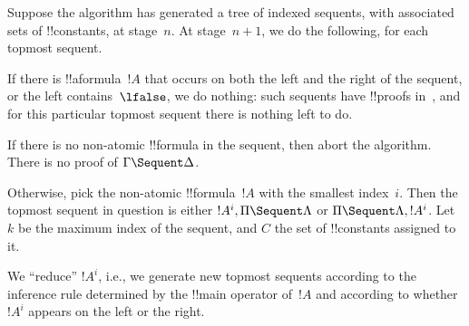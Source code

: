 \documentclass[../../../include/open-logic-section]{subfiles}
\begin{document}
Suppose the algorithm has generated a tree of indexed sequents, with
associated sets of !!{constant}s, at stage~$n$. At stage~$n+1$, we do
the following, for each topmost sequent. 

If there is !!a{formula}~$!A$ that occurs on both the left and the
right of the sequent, or the left contains~$\lfalse$, we do nothing:
such sequents have !!{proof}s in~, and for this particular
topmost sequent there is nothing left to do.

If there is no non-atomic !!{formula} in the sequent, then abort the
algorithm. There is no proof of $\Gamma \Sequent \Delta$.

Otherwise, pick the non-atomic !!{formula}~$!A$ with the smallest
index~$i$. Then the topmost sequent in question is either $!A^i, \Pi
\Sequent \Lambda$ or $\Pi \Sequent \Lambda, !A^i$. Let $k$ be the
maximum index of the sequent, and $C$ the set of !!{constant}s
assigned to it.

We ``reduce'' $!A^i$, i.e., we generate new topmost sequents according
to the inference rule determined by the !!{main operator} of~$!A$
and according to whether $!A^i$ appears on the left or the right.
\end{document}
